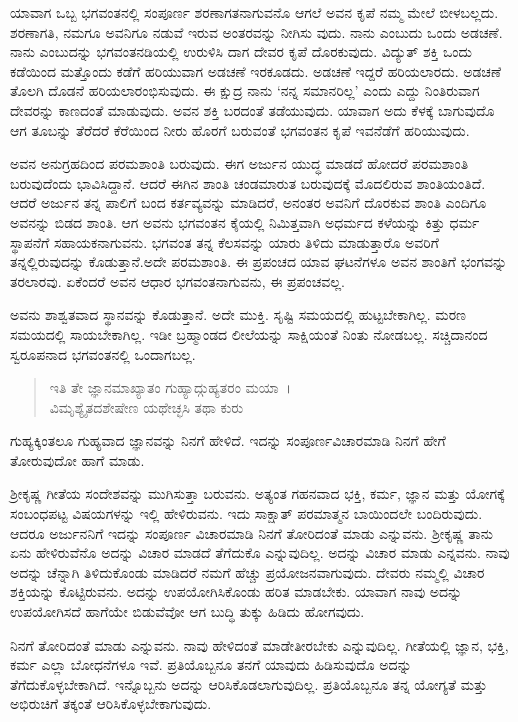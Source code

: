 ಯಾವಾಗ ಒಬ್ಬ ಭಗವಂತನಲ್ಲಿ ಸಂಪೂರ್ಣ ಶರಣಾಗತನಾಗುವನೊ ಆಗಲೆ ಅವನ ಕೃಪೆ ನಮ್ಮ ಮೇಲೆ ಬೀಳಬಲ್ಲದು. ಶರಣಾಗತಿ, ನಮಗೂ ಅವನಿಗೂ ನಡುವೆ ಇರುವ ಅಂತರವನ್ನು ನೀಗಿಸು ವುದು. ನಾನು ಎಂಬುದು ಒಂದು ಅಡಚಣೆ. ನಾನು ಎಂಬುದನ್ನು ಭಗವಂತನಡಿಯಲ್ಲಿ ಉರುಳಿಸಿ ದಾಗ ದೇವರ ಕೃಪೆ ದೊರಕುವುದು. ವಿದ್ಯುತ್ ಶಕ್ತಿ ಒಂದು ಕಡೆಯಿಂದ ಮತ್ತೊಂದು ಕಡೆಗೆ ಹರಿಯುವಾಗ ಅಡಚಣೆ ಇರಕೂಡದು. ಅಡಚಣೆ ಇದ್ದರೆ ಹರಿಯಲಾರದು. ಅಡಚಣೆ ತೊಲಗಿ ದೊಡನೆ ಹರಿಯಲಾರಂಭಿಸುವುದು. ಈ ಕ್ಷುದ್ರ ನಾನು ‘ನನ್ನ ಸಮಾನರಿಲ್ಲ’ ಎಂದು ಎದ್ದು ನಿಂತಿರುವಾಗ ದೇವರನ್ನು ಕಾಣದಂತೆ ಮಾಡುವುದು. ಅವನ ಶಕ್ತಿ ಬರದಂತೆ ತಡೆಯುವುದು. ಯಾವಾಗ ಅದು ಕೆಳಕ್ಕೆ ಬಾಗುವುದೊ ಆಗ ತೂಬನ್ನು ತೆರೆದರೆ ಕೆರೆಯಿಂದ ನೀರು ಹೊರಗೆ ಬರುವಂತೆ ಭಗವಂತನ ಕೃಪೆ ಇವನೆಡೆಗೆ ಹರಿಯುವುದು.

ಅವನ ಅನುಗ್ರಹದಿಂದ ಪರಮಶಾಂತಿ ಬರುವುದು. ಈಗ ಅರ್ಜುನ ಯುದ್ಧ ಮಾಡದೆ ಹೋದರೆ ಪರಮಶಾಂತಿ ಬರುವುದೆಂದು ಭಾವಿಸಿದ್ದಾನೆ. ಆದರೆ ಈಗಿನ ಶಾಂತಿ ಚಂಡಮಾರುತ ಬರುವುದಕ್ಕೆ ಮೊದಲಿರುವ ಶಾಂತಿಯಂತಿದೆ. ಆದರೆ ಅರ್ಜುನ ತನ್ನ ಪಾಲಿಗೆ ಬಂದ ಕರ್ತವ್ಯವನ್ನು ಮಾಡಿದರೆ, ಅನಂತರ ಅವನಿಗೆ ದೊರಕುವ ಶಾಂತಿ ಎಂದಿಗೂ ಅವನನ್ನು ಬಿಡದ ಶಾಂತಿ. ಆಗ ಅವನು ಭಗವಂತನ ಕೈಯಲ್ಲಿ ನಿಮಿತ್ತವಾಗಿ ಅಧರ್ಮದ ಕಳೆಯನ್ನು ಕಿತ್ತು ಧರ್ಮ ಸ್ಥಾಪನೆಗೆ ಸಹಾಯಕನಾಗುವನು. ಭಗವಂತ ತನ್ನ ಕೆಲಸವನ್ನು ಯಾರು ತಿಳಿದು ಮಾಡುತ್ತಾರೊ ಅವರಿಗೆ ತನ್ನಲ್ಲಿರುವುದನ್ನು ಕೊಡುತ್ತಾನೆ.ಅದೇ ಪರಮಶಾಂತಿ. ಈ ಪ್ರಪಂಚದ ಯಾವ ಘಟನೆಗಳೂ ಅವನ ಶಾಂತಿಗೆ ಭಂಗವನ್ನು ತರಲಾರವು. ಏಕೆಂದರೆ ಅವನ ಆಧಾರ ಭಗವಂತನಾಗುವನು, ಈ ಪ್ರಪಂಚವಲ್ಲ.

ಅವನು ಶಾಶ್ವತವಾದ ಸ್ಥಾನವನ್ನು ಕೊಡುತ್ತಾನೆ. ಅದೇ ಮುಕ್ತಿ. ಸೃಷ್ಟಿ ಸಮಯದಲ್ಲಿ ಹುಟ್ಟಬೇಕಾಗಿಲ್ಲ. ಮರಣ ಸಮಯದಲ್ಲಿ ಸಾಯಬೇಕಾಗಿಲ್ಲ. ಇಡೀ ಬ್ರಹ್ಮಾಂಡದ ಲೀಲೆಯನ್ನು ಸಾಕ್ಷಿಯಂತೆ ನಿಂತು ನೋಡಬಲ್ಲ. ಸಚ್ಚಿದಾನಂದ ಸ್ವರೂಪನಾದ ಭಗವಂತನಲ್ಲಿ ಒಂದಾಗಬಲ್ಲ.

\begin{verse}
ಇತಿ ತೇ ಜ್ಞಾನಮಾಖ್ಯಾತಂ ಗುಹ್ಯಾದ್ಗುಹ್ಯತರಂ ಮಯಾ~।\\ವಿಮೃಶ್ಯೈತದಶೇಷೇಣ ಯಥೇಚ್ಛಸಿ ತಥಾ ಕುರು 
\end{verse}

{\small ಗುಹ್ಯಕ್ಕಿಂತಲೂ ಗುಹ್ಯವಾದ ಜ್ಞಾನವನ್ನು ನಿನಗೆ ಹೇಳಿದೆ. ಇದನ್ನು ಸಂಪೂರ್ಣವಿಚಾರಮಾಡಿ ನಿನಗೆ ಹೇಗೆ ತೋರುವುದೋ ಹಾಗೆ ಮಾಡು.}

ಶ‍್ರೀಕೃಷ್ಣ ಗೀತೆಯ ಸಂದೇಶವನ್ನು ಮುಗಿಸುತ್ತಾ ಬರುವನು. ಅತ್ಯಂತ ಗಹನವಾದ ಭಕ್ತಿ, ಕರ್ಮ, ಜ್ಞಾನ ಮತ್ತು ಯೋಗಕ್ಕೆ ಸಂಬಂಧಪಟ್ಟ ವಿಷಯಗಳನ್ನು ಇಲ್ಲಿ ಹೇಳಿರುವನು. ಇದು ಸಾಕ್ಷಾತ್ ಪರಮಾತ್ಮನ ಬಾಯಿಂದಲೇ ಬಂದಿರುವುದು. ಆದರೂ ಅರ್ಜುನನಿಗೆ ಇದನ್ನು ಸಂಪೂರ್ಣ ವಿಚಾರಮಾಡಿ ನಿನಗೆ ತೋರಿದಂತೆ ಮಾಡು ಎನ್ನುವನು. ಶ‍್ರೀಕೃಷ್ಣ ತಾನು ಏನು ಹೇಳಿರುವೆನೊ ಅದನ್ನು ವಿಚಾರ ಮಾಡದೆ ತೆಗೆದುಕೊ ಎನ್ನುವುದಿಲ್ಲ. ಅದನ್ನು ವಿಚಾರ ಮಾಡು ಎನ್ನವನು. ನಾವು ಅದನ್ನು ಚೆನ್ನಾಗಿ ತಿಳಿದುಕೊಂಡು ಮಾಡಿದರೆ ನಮಗೆ ಹೆಚ್ಚು ಪ್ರಯೋಜನವಾಗುವುದು. ದೇವರು ನಮ್ಮಲ್ಲಿ ವಿಚಾರ ಶಕ್ತಿಯನ್ನು ಕೊಟ್ಟಿರುವನು. ಅದನ್ನು ಉಪಯೋಗಿಸಿಕೊಂಡು ಹರಿತ ಮಾಡಬೇಕು. ಯಾವಾಗ ನಾವು ಅದನ್ನು ಉಪಯೋಗಿಸದೆ ಹಾಗೆಯೇ ಬಿಡುವೆವೋ ಆಗ ಬುದ್ಧಿ ತುಕ್ಕು ಹಿಡಿದು ಹೋಗವುದು.

ನಿನಗೆ ತೋರಿದಂತೆ ಮಾಡು ಎನ್ನುವನು. ನಾವು ಹೇಳಿದಂತೆ ಮಾಡೇತೀರಬೇಕು ಎನ್ನುವುದಿಲ್ಲ. ಗೀತೆಯಲ್ಲಿ ಜ್ಞಾನ, ಭಕ್ತಿ, ಕರ್ಮ ಎಲ್ಲಾ ಬೋಧನೆಗಳೂ ಇವೆ. ಪ್ರತಿಯೊಬ್ಬನೂ ತನಗೆ ಯಾವುದು ಹಿಡಿಸುವುದೊ ಅದನ್ನು ತೆಗೆದುಕೊಳ್ಳಬೇಕಾಗಿದೆ. ಇನ್ನೊಬ್ಬನು ಅದನ್ನು ಆರಿಸಿಕೊಡಲಾಗುವುದಿಲ್ಲ. ಪ್ರತಿಯೊಬ್ಬನೂ ತನ್ನ ಯೋಗ್ಯತೆ ಮತ್ತು ಅಭಿರುಚಿಗೆ ತಕ್ಕಂತೆ ಆರಿಸಿಕೊಳ್ಳಬೇಕಾಗುವುದು.


